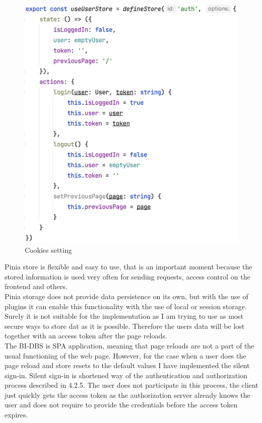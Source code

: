 \begin{figure}[h]
\centering
\includegraphics[scale=0.52]{../png/pinia_user.png}
\caption{Cookies setting}
\end{figure}

\noindent Pinia store is flexible and easy to use, that is an important moment because the stored information is used very often for sending requests, access control on the frontend and others.\\
Pinia storage does not provide data persistence on its own, but with the use of plugins it can enable this functionality with the use of local or session storage. Surely it is not suitable for the implementation as I am trying to use as most secure ways to store dat as it is possible. Therefore the users data will be lost together with an access token after the page reloads.\\
The BI-DBS is SPA application, meaning that page reloads are not a part of the usual functioning of the web page. However, for the case when a user does the page reload and store resets to the default values I have implemented the silent sign-in. Silent sign-in is shortened way of the authentication and authorization process described in 4.2.5. The user does not participate in this process, the client just quickly gets the access token as the authorization server already knows the user and does not require to provide the credentials before the access token expires.





